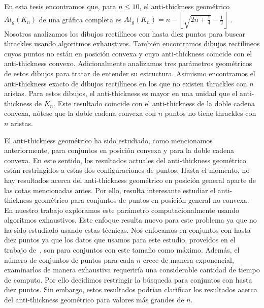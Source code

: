 En esta tesis encontramos que, para $n\leq 10$, el anti-thickness geométrico $At_g(K_n)$ de una gráfica
completa es $At_g(K_n) = n - \left\lfloor\sqrt{2n + \frac{1}{4}}- \frac{1}{2}\right\rfloor$ . Nosotros
analizamos los dibujos rectilíneos con hasta diez puntos para buscar thrackles usando
algoritmos exhaustivos. También encontramos dibujos rectilíneos cuyos puntos no están en posición convexa
y cuyo anti-thickness coincide con el anti-thickness convexo. Adicionalmente
analizamos tres parámetros geométricos de estos dibujos para tratar de entender su estructura. Asimismo
encontramos el anti-thickness exacto de dibujos rectilíneos en los que no existen thrackles con $n$
aristas. Para estos dibujos, el anti-thickness es mayor en una unidad que el anti-thickness de $K_n$. Este
resultado coincide con el anti-thickness de la doble cadena convexa, nótese que la doble cadena convexa con
$n$ puntos no tiene thrackles con $n$ aristas.

El anti-thickness geométrico ha sido estudiado, como mencionamos anteriormente, para conjuntos en posición
convexa y para la doble cadena convexa. En este sentido, los resultados actuales del
anti-thickness geométrico están restringidos a estas dos configuraciones de puntos. Hasta el momento, no
hay resultados acerca del anti-thickness geométrico en posición general aparte de las cotas mencionadas
antes. Por ello, resulta interesante estudiar el anti-thickness geométrico para conjuntos de puntos en
posición general no convexa. En nuestro trabajo exploramos este parámetro computacionalmente usando
algoritmos exhaustivos. Este enfoque resulta nuevo para este problema ya que no ha sido estudiado usando
estas técnicas. Nos enfocamos en conjuntos con hasta diez puntos ya que los datos que usamos para
este estudio, proveídos en el trabajo de~\cite{Aichholzer2001}, son para conjuntos con este tamaño como
máximo. Además, el número de conjuntos de puntos para cada $n$ crece de manera exponencial, examinarlos de
manera exhaustiva requeriría una considerable cantidad de tiempo de computo. Por ello decidimos restringir
la búsqueda para conjuntos con hasta diez puntos. Sin embargo, estos resultados podrían clarificar los
resultados acerca del anti-thickness geométrico para valores más grandes de $n$.


